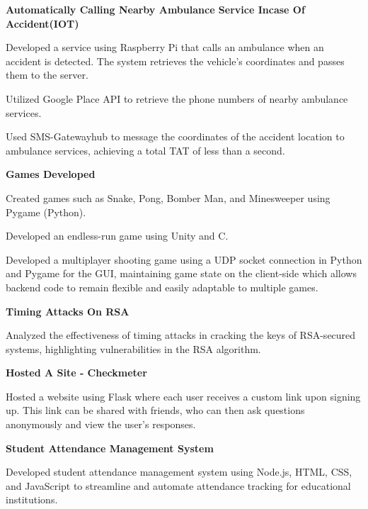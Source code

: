 \begin{cventries}
  \cventry
    { \textbf{ Automatically Calling Nearby Ambulance Service Incase Of Accident(IOT) } }{}{}{}
    {
      \begin{cvitems}
        \item {Developed a service using Raspberry Pi that calls an ambulance when an accident is detected. The system retrieves the vehicle's coordinates and passes them to the server.}
        \item {Utilized Google Place API to retrieve the phone numbers of nearby ambulance services.}
        \item {Used SMS-Gatewayhub to message the coordinates of the accident location to ambulance services, achieving a total TAT of less than a second.}
      \end{cvitems}
    }
  \cventry
    { \textbf{Games Developed} }{}{}{}
    {
      \begin{cvitems}
        \item {Created games such as Snake, Pong, Bomber Man, and Minesweeper using Pygame (Python).}
        \item {Developed an endless-run game using Unity and C.}
        \item {Developed a multiplayer shooting game using a UDP socket connection in Python and Pygame for the GUI, maintaining game state on the client-side which allows backend code to remain flexible and easily adaptable to multiple games.}
      \end{cvitems}
    }
  \cventry
    {\textbf{Timing Attacks On RSA}}{}{}{}
    {
      \begin{cvitems}
        \item {Analyzed the effectiveness of timing attacks in cracking the keys of RSA-secured systems, highlighting vulnerabilities in the RSA algorithm.}
      \end{cvitems}
    }
  \cventry
    { \textbf{ Hosted A Site - Checkmeter } }{}{}{}
    {
      \begin{cvitems}
        \item {Hosted a website using Flask where each user receives a custom link upon signing up. This link can be shared with friends, who can then ask questions anonymously and view the user's responses.}
      \end{cvitems}
    }
  \cventry
    { \textbf{ Student Attendance Management System } }{}{}{}
    {
      \begin{cvitems}
        \item {Developed student attendance management system using Node.js, HTML, CSS, and JavaScript to streamline and automate attendance tracking for educational institutions.}
      \end{cvitems}
    }
  
\end{cventries}